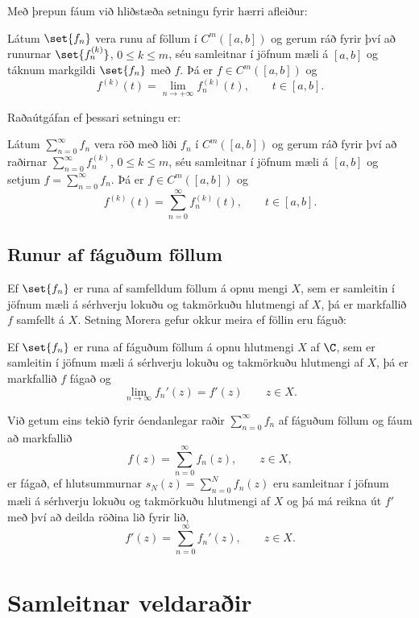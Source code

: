 \medskip
Með þrepun fáum við hliðstæða setningu fyrir hærri afleiður:

\begin{fs}
Látum $\set{f_n}$ vera runu af föllum í $C^m([a,b])$ og gerum
ráð fyrir því að runurnar $\set{f_n^{(k)}}$, $0\leq k\leq m$, séu
samleitnar í jöfnum mæli á $[a,b]$ og táknum markgildi $\set{f_n}$ með $f$.
Þá er $f\in C^m([a,b])$ og 
 $$f^{(k)}(t)=\lim_{n\to +\infty} f_n^{(k)}(t), \qquad t\in [a,b].
 $$
\end{fs}

\medskip
Raðaútgáfan ef þessari setningu er:

\begin{fs}
Látum $\sum_{n=0}^\infty f_n$ vera röð með liði $f_n$ í $C^m([a,b])$ og gerum
ráð fyrir því að raðirnar  $\sum_{n=0}^\infty {f_n^{(k)}}$, $0\leq k\leq m$, séu
samleitnar í jöfnum mæli á $[a,b]$ og setjum
$f=\sum_{n=0}^\infty {f_n}$.  Þá er $f\in C^m([a,b])$ og 
 $$f^{(k)}(t)=\sum_{n=0}^{\infty} f_n^{(k)}(t), \qquad t\in [a,b].
 $$
\end{fs}


\subsection*{Runur af fáguðum föllum}

Ef $\set{f_n}$ er runa af samfelldum föllum á opnu mengi $X$, sem er
samleitin í jöfnum mæli á sérhverju lokuðu og takmörkuðu hlutmengi af
$X$, þá er  markfallið $f$ samfellt
á $X$.   Setning Morera gefur okkur meira ef föllin eru fáguð:

\begin{se}
Ef $\set{f_n}$ er runa af fáguðum föllum á opnu hlutmengi $X$ af
$\C$, sem er samleitin í jöfnum mæli á sérhverju lokuðu og takmörkuðu
hlutmengi af $X$, þá er markfallið $f$ fágað og 
$$
\lim_{n\to \infty} f_n'(z)=f'(z)\qquad z\in X.
$$\end{se}

\smallskip

Við getum eins tekið fyrir óendanlegar raðir $\sum_{n=0}^\infty f_n$
af fáguðum föllum og fáum að markfallið
 $$f(z) = \sum_{n=0}^\infty f_n(z), \qquad z\in X,
 $$
er fágað, ef hlutsummurnar $s_N(z)=\sum_{n=0}^N f_n(z)$ eru samleitnar í jöfnum
mæli á sérhverju lokuðu og takmörkuðu hlutmengi af $X$ og þá má reikna
út $f'$ með því að deilda röðina lið fyrir lið,
 $$f'(z) = \sum_{n=0}^\infty f_n'(z), \qquad z\in X.
 $$


\section{Samleitnar veldaraðir}  


